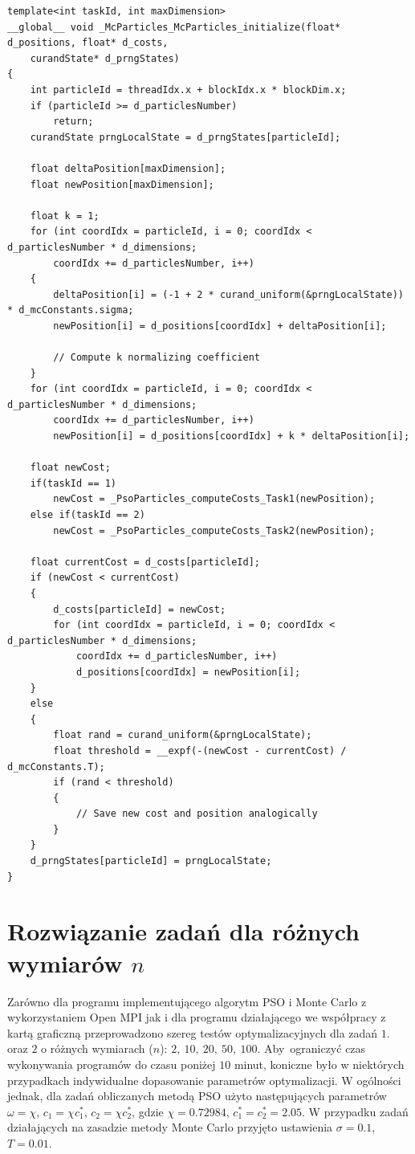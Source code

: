 \documentclass[11pt, a4paper, oneside]{article}
\begin{document}
\begin{lstlisting}[style=mycpp, label=lst:cuda_mc, caption={Kernel CUDA aktualizujący cząsteczkę Monte Carlo.}]
template<int taskId, int maxDimension>
__global__ void _McParticles_McParticles_initialize(float* d_positions, float* d_costs,
	curandState* d_prngStates)
{
	int particleId = threadIdx.x + blockIdx.x * blockDim.x;
	if (particleId >= d_particlesNumber)
		return;
	curandState prngLocalState = d_prngStates[particleId];

	float deltaPosition[maxDimension];
	float newPosition[maxDimension];

	float k = 1;
	for (int coordIdx = particleId, i = 0; coordIdx < d_particlesNumber * d_dimensions;
		coordIdx += d_particlesNumber, i++)
	{
		deltaPosition[i] = (-1 + 2 * curand_uniform(&prngLocalState)) * d_mcConstants.sigma;
		newPosition[i] = d_positions[coordIdx] + deltaPosition[i];

		// Compute k normalizing coefficient
	}
	for (int coordIdx = particleId, i = 0; coordIdx < d_particlesNumber * d_dimensions;
		coordIdx += d_particlesNumber, i++)
		newPosition[i] = d_positions[coordIdx] + k * deltaPosition[i];

	float newCost;
	if(taskId == 1)
		newCost = _PsoParticles_computeCosts_Task1(newPosition);
	else if(taskId == 2)
		newCost = _PsoParticles_computeCosts_Task2(newPosition);

	float currentCost = d_costs[particleId];
	if (newCost < currentCost)
	{
		d_costs[particleId] = newCost;
		for (int coordIdx = particleId, i = 0; coordIdx < d_particlesNumber * d_dimensions;
			coordIdx += d_particlesNumber, i++)
			d_positions[coordIdx] = newPosition[i];
	}
	else
	{
		float rand = curand_uniform(&prngLocalState);
		float threshold = __expf(-(newCost - currentCost) / d_mcConstants.T);
		if (rand < threshold)
		{
			// Save new cost and position analogically
		}
	}
	d_prngStates[particleId] = prngLocalState;
}
\end{lstlisting}

\section{Rozwiązanie zadań dla różnych wymiarów $n$}
Zarówno dla programu implementującego algorytm PSO i Monte Carlo z wykorzystaniem Open MPI jak i dla programu działającego we współpracy z kartą graficzną przeprowadzono szereg testów optymalizacyjnych dla zadań $1$. oraz $2$ o różnych wymiarach ($n$): $2, \ 10, \ 20, \ 50, \ 100$. Aby~ograniczyć czas wykonywania programów do czasu poniżej $10$ minut, koniczne było w niektórych przypadkach indywidualne dopasowanie parametrów optymalizacji. W ogólności jednak, dla zadań obliczanych metodą PSO użyto następujących parametrów $\omega = \chi$, $c_1 = \chi c_1^*$, $c_2 = \chi c_2^*$, gdzie $\chi = 0.72984$, $c_1^* = c_2^* = 2.05$. W przypadku zadań działających na zasadzie metody Monte Carlo przyjęto ustawienia $\sigma = 0.1$, $T = 0.01$. 
\end{document}

